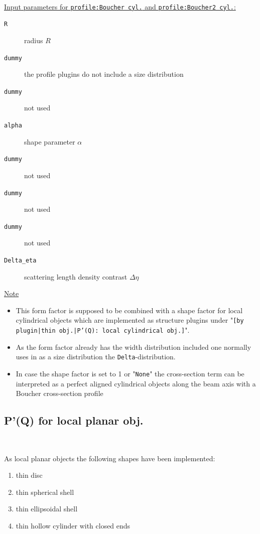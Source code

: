 \hspace{1pt}\\
\uline{Input parameters for \texttt{profile:Boucher cyl.} and \texttt{profile:Boucher2 cyl.}:}
\begin{description}
    \item[\texttt{R}] radius $R$
    \item[\texttt{dummy}] the profile plugins do not include a size distribution
    \item[\texttt{dummy}] not used
    \item[\texttt{alpha}] shape parameter $\alpha$
    \item[\texttt{dummy}] not used
    \item[\texttt{dummy}] not used
    \item[\texttt{dummy}] not used
    \item[\texttt{Delta\_eta}] scattering length density contrast $\Delta \eta$
\end{description}
\noindent
\uline{Note}
\begin{itemize}
  \item This form factor is supposed to be combined with a shape factor for
local cylindrical objects which are implemented as structure  plugins
under "\texttt{[by plugin|thin obj.|P'(Q): local cylindrical obj.]}".
\item As the form factor already has the width distribution included one normally uses in \SASfit as a size distribution
the \texttt{Delta}-distribution.
\item In case the shape factor is set to 1 or "\texttt{None}" the cross-section term can be interpreted as a perfect aligned cylindrical objects along the beam axis with a Boucher cross-section profile
\end{itemize}


\clearpage
\subsection{P'(Q) for local planar obj.} ~\\
\label{plugin:Pprime4planar}

As local planar objects the following shapes have been implemented:
\begin{enumerate}
\item thin disc
\item thin spherical shell
\item thin ellipsoidal shell
\item thin hollow cylinder with closed ends
\end{enumerate}

